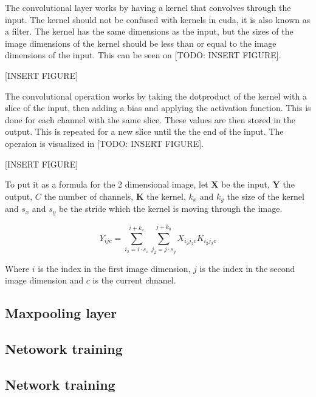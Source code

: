\documentclass{article}
\begin{document}
The convolutional layer works by having a kernel that convolves through the input. The kernel should not be confused with kernels in cuda, it is also known as a filter. The kernel has the same dimensions as the input, but the sizes of the image dimensions of the kernel should be less than or equal to the image dimensions of the input. This can be seen on [TODO: INSERT FIGURE].

[INSERT FIGURE]

The convolutional operation works by taking the dotproduct of the kernel with a slice of the input, then adding a bias and applying the activation function. This is done for each channel with the same slice. These values are then stored in the output. This is repeated for a new slice until the the end of the input. The operaion is visualized in [TODO: INSERT FIGURE].

[INSERT FIGURE]

To put it as a formula for the 2 dimensional image, let $\bm{X}$ be the input, $\bm{Y}$ the output, $C$ the number of channels, $\bm{K}$ the kernel, $k_x$ and $k_y$ the size of the kernel and $s_x$ and $s_y$ be the stride which the kernel is moving through the image.

$$Y_{ijc} = \sum^{i + k_x}_{i_2 = i \cdot s_x} \sum^{j + k_y}_{j_2 = j \cdot s_y} X_{i_2j_2c} K_{i_2j_2c} $$

Where $i$ is the index in the first image dimension, $j$ is the index in the second image dimension and $c$ is the current chnanel.

\subsection{Maxpooling layer}

\subsection{Netowork training}



\subsection{Network training}
\end{document}
